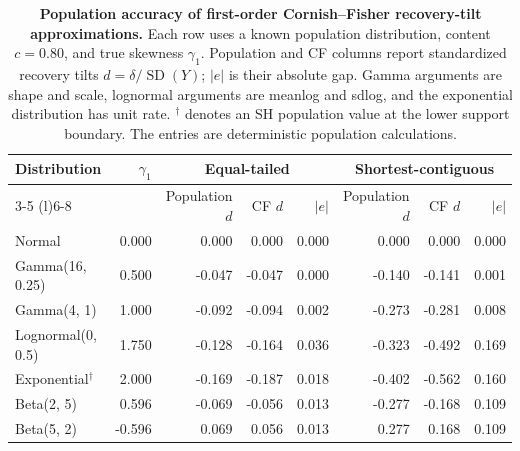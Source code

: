 \begin{table}[H]
\centering
\caption[Cornish--Fisher recovery-tilt accuracy]{\textbf{Population accuracy of first-order Cornish--Fisher recovery-tilt approximations.} Each row uses a known population distribution, content $c=0.80$, and true skewness $\gamma_1$. Population and CF columns report standardized recovery tilts $d=\delta/\operatorname{SD}(Y)$; $|e|$ is their absolute gap. Gamma arguments are shape and scale, lognormal arguments are meanlog and sdlog, and the exponential distribution has unit rate. $^{\dagger}$ denotes an SH population value at the lower support boundary. The entries are deterministic population calculations.}
\label{rqr2026:tab:mean-tilt-cf-mini-study}
\TableStyle
\begin{tabular}{@{}l@{\hspace{0.8em}}rrrrrrr@{}}
\toprule
Distribution & $\gamma_1$ & \multicolumn{3}{c}{Equal-tailed} & \multicolumn{3}{c}{Shortest-contiguous} \\
\cmidrule(lr){3-5} \cmidrule(l){6-8}
& & Population $d$ & CF $d$ & $|e|$ & Population $d$ & CF $d$ & $|e|$ \\
\midrule
Normal & 0.000 & 0.000 & 0.000 & 0.000 & 0.000 & 0.000 & 0.000 \\
Gamma(16, 0.25) & 0.500 & -0.047 & -0.047 & 0.000 & -0.140 & -0.141 & 0.001 \\
Gamma(4, 1) & 1.000 & -0.092 & -0.094 & 0.002 & -0.273 & -0.281 & 0.008 \\
Lognormal(0, 0.5) & 1.750 & -0.128 & -0.164 & 0.036 & -0.323 & -0.492 & 0.169 \\
Exponential$^{\dagger}$ & 2.000 & -0.169 & -0.187 & 0.018 & -0.402 & -0.562 & 0.160 \\
Beta(2, 5) & 0.596 & -0.069 & -0.056 & 0.013 & -0.277 & -0.168 & 0.109 \\
Beta(5, 2) & -0.596 & 0.069 & 0.056 & 0.013 & 0.277 & 0.168 & 0.109 \\
\bottomrule
\end{tabular}
\end{table}
